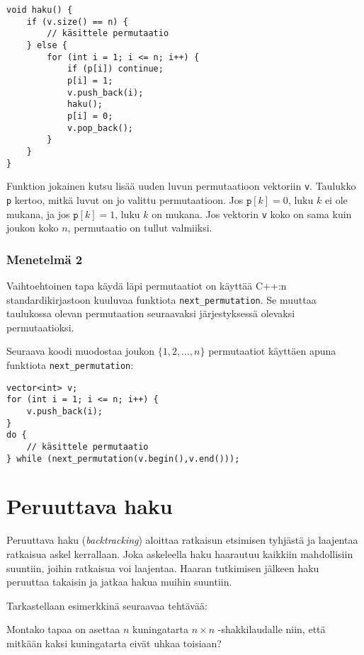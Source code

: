 \begin{lstlisting}
void haku() {
    if (v.size() == n) {
        // käsittele permutaatio
    } else {
        for (int i = 1; i <= n; i++) {
            if (p[i]) continue;
            p[i] = 1;
            v.push_back(i);
            haku();
            p[i] = 0;
            v.pop_back();
        }
    }
}
\end{lstlisting}

Funktion jokainen kutsu lisää uuden
luvun permutaatioon vektoriin \texttt{v}.
Taulukko \texttt{p} kertoo, mitkä luvut on jo
valittu permutaatioon.
Jos $\texttt{p}[k]=0$, luku $k$ ei ole mukana,
ja jos $\texttt{p}[k]=1$, luku $k$ on mukana.
Jos vektorin \texttt{v} koko on sama kuin
joukon koko $n$, permutaatio on tullut valmiiksi.

\subsubsection{Menetelmä 2}

Vaihtoehtoinen tapa käydä läpi permutaatiot
on käyttää C++:n standardikirjastoon kuuluvaa
funktiota \texttt{next\_permutation}.
Se muuttaa taulukossa olevan permutaation
seuraavaksi järjestyksessä olevaksi permutaatioksi.

Seuraava koodi muodostaa joukon $\{1,2,\ldots,n\}$
permutaatiot käyttäen apuna funktiota \texttt{next\_permutation}:

\begin{lstlisting}
vector<int> v;
for (int i = 1; i <= n; i++) {
    v.push_back(i);
}
do {
    // käsittele permutaatio
} while (next_permutation(v.begin(),v.end()));
\end{lstlisting}

\section{Peruuttava haku}


Peruuttava haku (\textit{backtracking})
aloittaa ratkaisun etsimisen tyhjästä
ja laajentaa ratkaisua askel kerrallaan.
Joka askeleella haku haarautuu kaikkiin
mahdollisiin suuntiin, joihin ratkaisua voi laajentaa.
Haaran tutkimisen jälkeen haku peruuttaa takaisin
ja jatkaa hakua muihin suuntiin.

Tarkastellaan esimerkkinä seuraavaa tehtävää:

\begin{task}
Montako tapaa on asettaa $n$ kuningatarta
$n \times n$ -shakkilaudalle niin,
että mitkään kaksi kuningatarta eivät uhkaa toisiaan?
\end{task}

